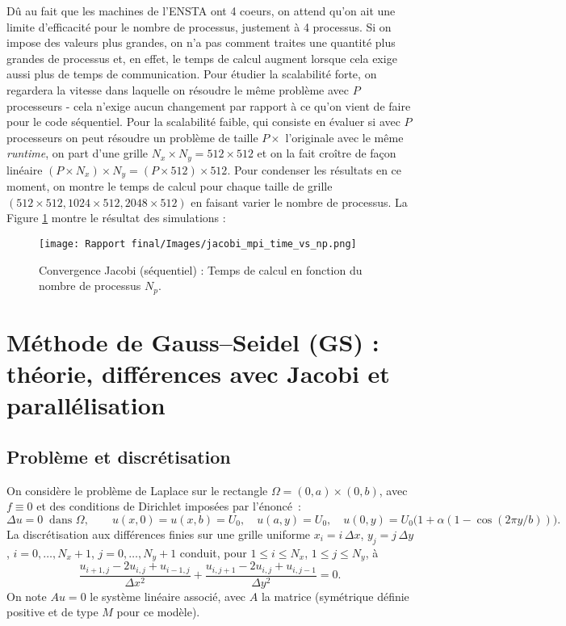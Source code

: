 \documentclass{article}
\begin{document}
Dû au fait que les machines de l'ENSTA ont 4 coeurs, on attend qu'on ait une limite d'efficacité pour le nombre de processus, justement à 4 processus. Si on impose des valeurs plus grandes, on n'a pas comment traites une quantité plus grandes de processus et, en effet, le temps de calcul augment lorsque cela exige aussi plus de temps de communication. Pour étudier la scalabilité forte, on regardera la vitesse dans laquelle on résoudre le même problème avec $P$ processeurs - cela n'exige aucun changement par rapport à ce qu'on vient de faire pour le code séquentiel. Pour la scalabilité faible, qui consiste en évaluer si avec $P$ processeurs on peut résoudre un problème de taille $P \times$ l'originale avec le même \textit{runtime}, on part d'une grille $N_x \times N_y = 512 \times 512$ et on la fait croître de façon linéaire $(P \times N_x) \times N_y = (P \times 512) \times 512$. Pour condenser les résultats en ce moment, on montre le temps de calcul pour chaque taille de grille $(512\times 512, 1024\times 512, 2048 \times 512) $ en faisant varier le nombre de processus. La Figure \ref{fig:jacobi_mpi} montre le résultat des simulations :

\begin{figure}[h!]
  \centering
  \texttt{[image: Rapport final/Images/jacobi\_mpi\_time\_vs\_np.png]} %
  \caption{Convergence Jacobi (séquentiel) : Temps de calcul en fonction du nombre de processus $N_p$.}
  \label{fig:jacobi_mpi}
\end{figure}

\section{Méthode de Gauss--Seidel (GS) : théorie, différences avec Jacobi et parallélisation}

\subsection{Problème et discrétisation}
On considère le problème de Laplace sur le rectangle $\Omega=(0,a)\times(0,b)$, avec $f\equiv0$ et des conditions de Dirichlet imposées par l'énoncé~\cite{projet1}:
\[
\Delta u = 0 \ \text{ dans }\Omega, \qquad
u(x,0)=u(x,b)=U_0,\quad u(a,y)=U_0,\quad
u(0,y)=U_0\bigl(1+\alpha(1-\cos(2\pi y/b))\bigr).
\]
La discrétisation aux différences finies sur une grille uniforme $x_i=i\,\Delta x$, $y_j=j\,\Delta y$, $i=0,\dots,N_x{+}1$, $j=0,\dots,N_y{+}1$ conduit, pour $1\le i\le N_x$, $1\le j\le N_y$, à
\[
\frac{u_{i+1,j}-2u_{i,j}+u_{i-1,j}}{\Delta x^2}
+
\frac{u_{i,j+1}-2u_{i,j}+u_{i,j-1}}{\Delta y^2} = 0.
\]
On note $A u = 0$ le système linéaire associé, avec $A$ la matrice (symétrique définie positive et de type $M$ pour ce modèle). \cite{projet1}
\end{document}
